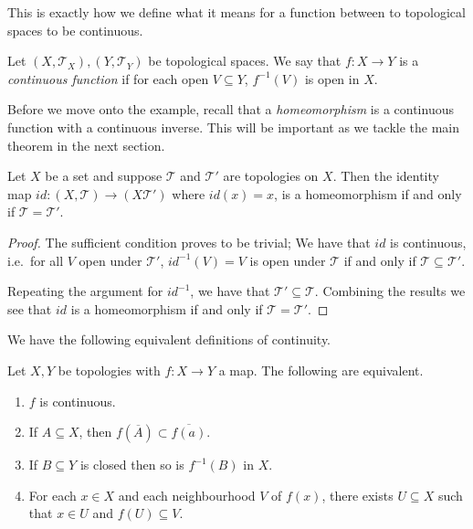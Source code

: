 This is exactly how we define what it means for a function between to
topological spaces to be continuous.

\begin{defn}
  Let $(X,\mathscr{T}_X),(Y,\mathscr{T}_Y)$ be topological spaces. We
  say that $f: X \rightarrow Y$ is a \emph{continuous function} if for
  each open $V \subseteq Y$, $f^{-1}(V)$ is open in $X$.
\end{defn}

Before we move onto the example, recall that a \emph{homeomorphism} is
a continuous function with a continuous inverse. This will be
important as we tackle the main theorem in the next section.

\begin{exmp}
  Let $X$ be a set and suppose $\mathscr{T}$ and $\mathscr{T}'$ are
  topologies on $X$. Then the identity map $id : (X,\mathscr{T})
  \rightarrow (X \mathscr{T}')$ where $id(x) = x$, is a homeomorphism
  if and only if $\mathscr{T} = \mathscr{T}'$. 
\end{exmp}

\begin{proof}
  The sufficient condition proves to be trivial;
  We have that $id$ is continuous, i.e.\ for all $V$ open under
  $\mathscr{T}'$, $id^{-1}(V) = V$ is open under $\mathscr{T}$ if and
  only if $\mathscr{T} \subseteq \mathscr{T}'$.

  Repeating the argument for $id^{-1}$, we have that $\mathscr{T}'
  \subseteq \mathscr{T}$. Combining the results we see that $id$ is a
  homeomorphism if and only if $\mathscr{T} = \mathscr{T}'$.
\end{proof}

We have the following equivalent definitions of continuity.

\begin{thm}
  Let $X,Y$ be topologies with $f : X \rightarrow Y$ a map. The
  following are equivalent.
  \begin{enumerate}
  \item $f$ is continuous.
  \item If $A \subseteq X$, then $f(\overline{A}) \subset %
    \overline{f(a)}$.
  \item If $B \subseteq Y$ is closed then so is $f^{-1}(B)$ in $X$. %
  \item For each $x \in X$ and each neighbourhood $V$ of $f(x)$,
    there exists $U \subseteq X$ such that $x \in U$ and $f(U)
    \subseteq V$.
  \end{enumerate}
\end{thm}

